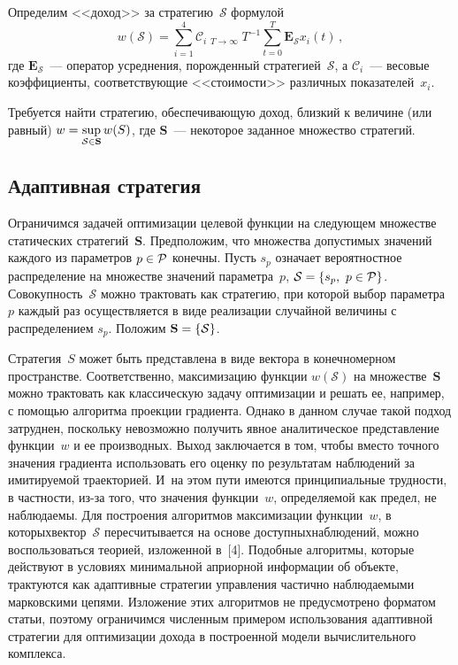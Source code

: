 \begin{multicols}{2}
    Определим <<доход>> за стратегию~$\mathcal{S}$ формулой
     $$
w(\mathcal{S}) =\sum\limits_{i=1}^4 \mathcal{C}_i 
\mathop{\underline{\lim}}_{T\rightarrow\infty} T^{-
1}\sum\limits_{t=0}^T \mathbf{E}_{\mathcal{S}} x_i(t)\,,
    $$
где $\mathbf{E}_{\mathcal{S}}$~--- оператор усреднения, порожденный стратегией~$\mathcal{S}$, 
а $\mathcal{C}_i$~--- весовые коэффициенты, соответствующие <<стоимости>> 
различных показателей~$x_i$. 

Требуется найти стратегию, обес\-пе\-чи\-ва\-ющую 
доход, близкий к величине (или равный) $w\hm=\sup\limits_{\mathcal{S}\in 
\mathbf{S}} w(S)$, где $\mathbf{S}$~--- некоторое заданное множество 
стратегий.


\subsection{Адаптивная стратегия}

    Ограничимся задачей оптимизации целевой функции на следующем 
множестве статических стратегий~\textbf{S}. Предположим, что множества 
до\-пус\-ти\-мых значений каждого из параметров $p\hm\in \mathcal{P}$ конечны. Пусть 
$s_p$ означает вероятностное распределение на множестве значений 
параметра~$p$, $\mathcal{S}\hm=\{ s_p,\ p\in \mathcal{P}\}$. Совокупность~$\mathcal{S}$ можно 
трактовать как стратегию, при которой выбор параметра~$p$ каждый раз 
осуществляется в виде реализации случайной величины с распределением 
$s_p$. Положим $\mathbf{S}\hm=\{\mathcal{S}\}$.
    
    Стратегия~$S$ может быть представлена в виде вектора в 
конечномерном пространстве. Соответственно, максимизацию функции 
$w(\mathcal{S})$ на множестве~$\mathbf{S}$ можно трактовать как классическую 
задачу оптимизации и решать ее, например, с помощью алгоритма проекции 
градиента. Однако в данном случае такой подход затруднен, поскольку 
невозможно получить явное аналитическое представление функции~$w$ и 
ее производных. Выход заключается в том, чтобы вместо точного значения 
градиента использовать его оценку по результатам наблюдений за 
имитируемой траекторией. И~на этом пути имеются принципиальные 
трудности, в част\-ности, из-за того, что значения функции~$w$, 
опреде\-ля\-емой как предел, не наблюдаемы. Для построения ал\-горитмов 
максимизации функции~$w$, в которых\linebreak вектор~$\mathcal{S}$ пересчитывается на 
основе доступных\linebreak наблюдений, можно воспользоваться теорией, 
изложенной в~[4]. Подобные алгоритмы, которые действуют в условиях 
минимальной априорной информации об объекте, трактуются как 
адаптивные стратегии управления частично наблюдаемыми марковскими 
цепями. Изложение этих алгоритмов не предусмотрено форматом статьи, 
поэтому ограничимся численным примером использования адаптивной 
стратегии для оптимизации дохода в построенной модели вычислительного 
комплекса.


\end{multicols}

